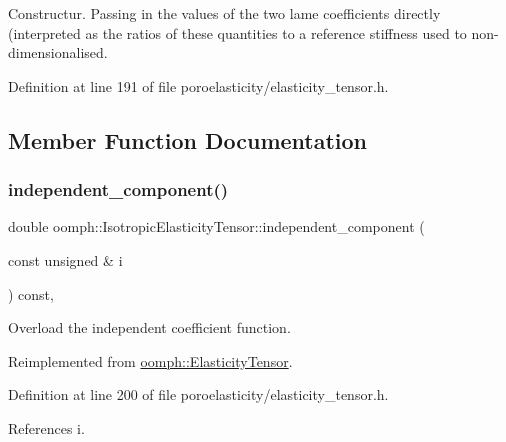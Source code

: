 Constructur. Passing in the values of the two lame coefficients directly (interpreted as the ratios of these quantities to a reference stiffness used to non-\/dimensionalised. 



Definition at line 191 of file poroelasticity/elasticity\+\_\+tensor.\+h.



\subsection{Member Function Documentation}
\mbox{\label{classoomph_1_1IsotropicElasticityTensor_a6b4a91ef7585590886cd191a7c03827d}} 
\subsubsection{\texorpdfstring{independent\+\_\+component()}{independent\_component()}\hspace{0.1cm}{\footnotesize\ttfamily [1/2]}}
{\footnotesize\ttfamily double oomph\+::\+Isotropic\+Elasticity\+Tensor\+::independent\+\_\+component (\begin{DoxyParamCaption}\item[{const unsigned \&}]{i }\end{DoxyParamCaption}) const\hspace{0.3cm}{\ttfamily [inline]}, {\ttfamily [virtual]}}



Overload the independent coefficient function. 



Reimplemented from \hyperlink{classoomph_1_1ElasticityTensor_a84b2a9b7a447cf88b2d6b98b5e6e7bd5}{oomph\+::\+Elasticity\+Tensor}.



Definition at line 200 of file poroelasticity/elasticity\+\_\+tensor.\+h.



References i.

\mbox{\label{classoomph_1_1IsotropicElasticityTensor_a6b4a91ef7585590886cd191a7c03827d}} 
